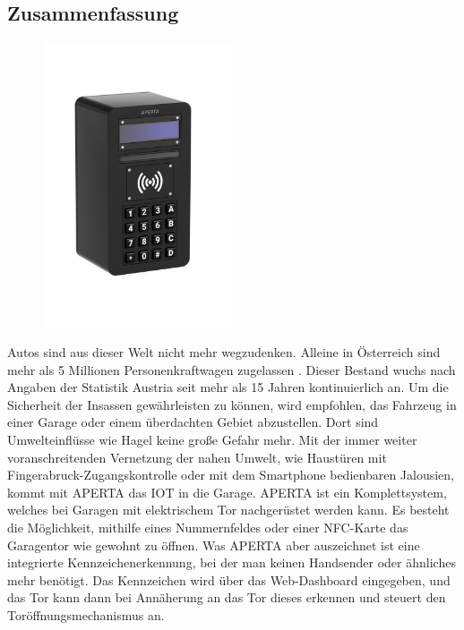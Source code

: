 \newpage
\begin{spacing}{1}
    \chapter*{Zusammenfassung}
\end{spacing}
\begin{figure}
    \begin{center}
      \includegraphics[width=0.5\textwidth]{pics/all-in-package.png}
    \end{center}
\end{figure}
Autos sind aus dieser Welt nicht mehr wegzudenken. Alleine in Österreich sind mehr als 5 Millionen Personenkraftwagen zugelassen \cite{StatAustPKW}. Dieser Bestand wuchs nach Angaben der Statistik Austria seit mehr als 15 Jahren kontinuierlich an. Um die Sicherheit der Insassen gewährleisten zu können, wird empfohlen, das Fahrzeug in einer Garage oder einem überdachten Gebiet abzustellen. Dort sind Umwelteinflüsse wie Hagel keine große Gefahr mehr.
Mit der immer weiter voranschreitenden Vernetzung der nahen Umwelt, wie Haustüren mit Fingerabruck-Zugangskontrolle oder mit dem Smartphone bedienbaren Jalousien, kommt mit APERTA das IOT in die Garage.
APERTA ist ein Komplettsystem, welches bei Garagen mit elektrischem Tor nachgerüstet werden kann. Es besteht die Möglichkeit, mithilfe eines Nummernfeldes oder einer NFC-Karte das Garagentor wie gewohnt zu öffnen. Was APERTA aber auszeichnet ist eine integrierte Kennzeichenerkennung, bei der man keinen Handsender oder ähnliches mehr benötigt. Das Kennzeichen wird über das Web-Dashboard eingegeben, und das Tor kann dann bei Annäherung an das Tor dieses erkennen und steuert den Toröffnungsmechanismus an.

